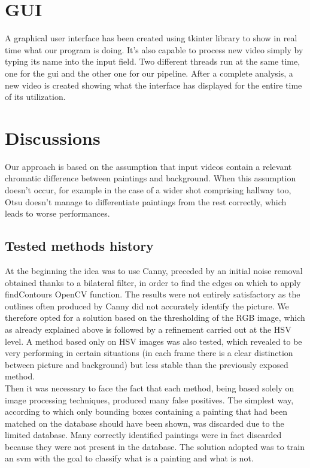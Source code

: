 \documentclass[conference]{IEEEtran}
\begin{document}
\bigskip
\bigskip
\bigskip


\section{GUI}
A graphical user interface has been created using tkinter library \cite{b12} to show in real time what our program is doing. It’s also capable to process new video simply by typing its name into the input field.
Two different threads run at the same time, one for the gui and the other one for our pipeline.
After a complete analysis, a new video is created showing what the interface has displayed for the entire time of its utilization.

\bigskip

\section{Discussions}
Our approach is based on the assumption that input videos contain a relevant chromatic difference between paintings and background. When this assumption doesn’t occur, for example in the case of a wider shot comprising hallway too, Otsu doesn’t manage to differentiate paintings from the rest correctly, which leads to worse performances.
\subsection*{Tested methods history}
At the beginning the idea was to use Canny, preceded by an initial noise removal obtained thanks to a bilateral filter, in order to find the edges on which to apply findContours OpenCV function. The results were not entirely satisfactory as the outlines often produced by Canny did not accurately identify the picture. We therefore opted for a solution based on the thresholding of the RGB image, which as already explained above is followed by a refinement carried out at the HSV level. A method based only on HSV images was also tested, which revealed to be very performing in certain situations (in each frame there is a clear distinction between picture and background) but less stable than the previously exposed method.\\
Then it was necessary to face the fact that each method, being based solely on image processing techniques, produced many false positives. The simplest way, according to which only bounding boxes containing a painting that had been matched on the database should have been shown, was discarded due to the limited database. Many correctly identified paintings were in fact discarded because they were not present in the database. The solution adopted was to train an svm with the goal to classify what is a painting and what is not.\\
\end{document}
